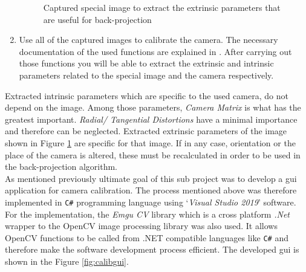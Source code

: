 \documentclass[a4paper,12pt]{report}%
\begin{document}
\begin{enumerate}
\begin{figure}[H]
{{			}\hfill
			}
		\caption{Captured special image to extract the extrinsic parameters that are useful for back-projection}
		\label{fig:backprojectimage}
	\end{figure}
	
	\item Use all of the captured images to calibrate the camera. The necessary documentation of the used functions are explained in \cite{backproject:_nodate-1}. After carrying out those functions you will be able to extract the extrinsic and intrinsic parameters related to the special image and the camera respectively.
\end{enumerate}	

Extracted intrinsic parameters which are specific to the  used  camera, do not depend on the image. Among those parameters, \textit{Camera Matrix} is what has the greatest important. \textit{Radial/ Tangential Distortions} have a minimal importance and therefore can be neglected. Extracted extrinsic parameters of the image shown in Figure \ref{fig:backprojectimage}  are specific for that image. If in any case, orientation or the place of the camera is altered, these must be recalculated in order to be used in the back-projection algorithm.\\
	
	
	

As mentioned previously ultimate goal of this sub project was to develop a \ac{gui} application for camera calibration. The process mentioned above was therefore implemented in {\tt C\#} programming language using `\textit{Visual Studio 2019}' software. For the implementation, the \textit{Emgu CV} library which is a cross platform \textit{.Net} wrapper to the OpenCV image processing library was also used. It allows OpenCV functions to be called from .NET compatible languages like {\tt C\#} and therefore make the software development process efficient. The developed \ac{gui} is shown in the Figure \ref{fig:calibgui}.
\end{document}
